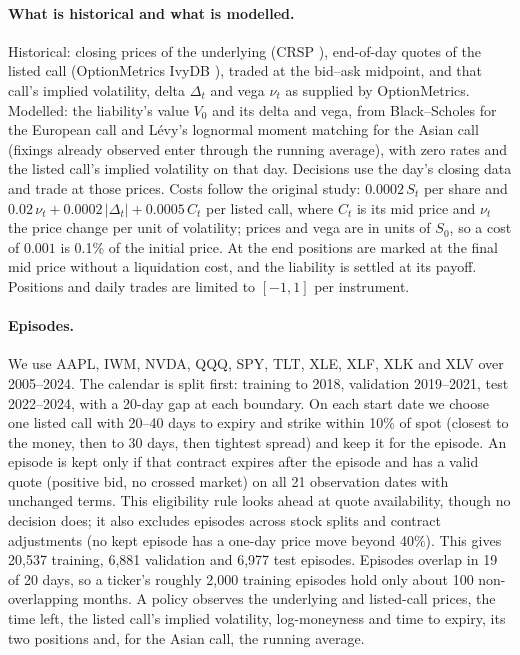 \documentclass[runningheads]{llncs}
\begin{document}
\paragraph{What is historical and what is modelled.} Historical: closing prices of the underlying (CRSP
\cite{crspStock}), end-of-day quotes of the listed call (OptionMetrics IvyDB \cite{wrdsOptionMetrics}),
traded at the bid--ask midpoint, and that call's implied volatility, delta $\Delta_t$ and vega $\nu_t$ as
supplied by OptionMetrics. Modelled: the liability's value $V_0$ and its delta and vega, from
Black--Scholes \cite{black1973pricing} for the European call and Lévy's lognormal moment matching for the
Asian call (fixings already observed enter through the running average), with zero rates and the listed
call's implied volatility on that day. Decisions use the day's closing data and trade at those prices.
Costs follow the original study: $0.0002\,S_t$ per share and $0.02\,\nu_t+0.0002\,|\Delta_t|+0.0005\,C_t$
per listed call, where $C_t$ is its mid price and $\nu_t$ the price change per unit of volatility; prices
and vega are in units of $S_0$, so a cost of $0.001$ is 0.1\% of the initial price. At the end positions
are marked at the final mid price without a liquidation cost, and the liability is settled at its payoff.
Positions and daily trades are limited to $[-1,1]$ per instrument.

\paragraph{Episodes.} We use AAPL, IWM, NVDA, QQQ, SPY, TLT, XLE, XLF, XLK and XLV over 2005--2024. The
calendar is split first: training to 2018, validation 2019--2021, test 2022--2024, with a 20-day gap at
each boundary. On each start date we choose one listed call with 20--40 days to expiry and strike within
10\% of spot (closest to the money, then to 30 days, then tightest spread) and keep it for the episode. An
episode is kept only if that contract expires after the episode and has a valid quote (positive bid, no
crossed market) on all 21 observation dates with unchanged terms. This eligibility rule looks ahead at
quote availability, though no decision does; it also excludes episodes across stock splits and contract
adjustments (no kept episode has a one-day price move beyond 40\%). This gives 20,537 training, 6,881
validation and 6,977 test episodes. Episodes overlap in 19 of 20 days, so a ticker's roughly 2,000
training episodes hold only about 100 non-overlapping months. A policy observes the
underlying and listed-call prices, the time left, the listed call's implied volatility, log-moneyness and
time to expiry, its two positions and, for the Asian call, the running average.
\end{document}
